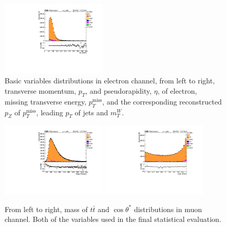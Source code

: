 \begin{figure}
  \includegraphics[width=0.45\textwidth]{fig/app4/ele/M_T_aft.pdf}
  \caption{Basic variables distributions in electron channel, from left to right, transverse momentum, $p_{T}$, and pseudorapidity, $\eta$, of electron, missing transverse energy, $p_{T}^{\text{miss}}$, and the corresponding reconstructed $p_{Z}$ of $p_{T}^{\text{miss}}$, leading $p_{T}$ of jets and $m_{T}^{W}$.}
  \label{Fig:DataMCLeptons}
  \end{figure}

\begin{figure}
  \centering
  \includegraphics[width=0.45\textwidth]{fig/app4/muon/Mass_tt.pdf}
  \includegraphics[width=0.45\textwidth]{fig/app4/muon/cos_theta.pdf} \\
  \caption{From left to right, mass of $t\bar t$ and $\cos\theta^*$ distributions in muon channel. Both of the variables used in the final statistical evaluation.}
  \label{Fig:DataMCMuon3}
  \end{figure}


\clearpage{\pagestyle{empty}\cleardoublepage}
